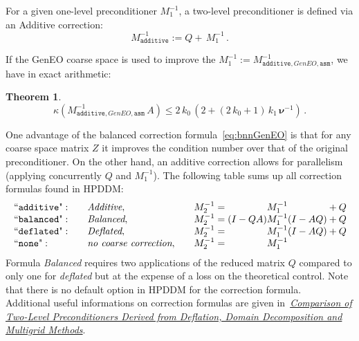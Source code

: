 \documentclass{article}
\newtheorem{theorem}{Theorem}[section]
\begin{document}
For a given one-level preconditioner $M_1^{-1}$, a two-level preconditioner is defined via an Additive correction:
\begin{equation}
  \label{eq:add}
  \boxed{
 M_{\texttt{additive}}^{-1} := Q+\,M_{1}^{-1}\,.
 }
\end{equation}


If the GenEO coarse space is used to improve the $M_1^{-1}:=M_{\texttt{additive},GenEO,\texttt{asm}}^{-1}$, we have in exact arithmetic:
\begin{theorem}
  \label{th:geneoadditive}
\[
 \kappa({M_{\texttt{additive},GenEO,\texttt{asm}}^{-1}\,A}) \le 2\,k_0\,(2+(2\,k_0+1)\,k_1\,\boldsymbol{\nu}^{-1})\,.
\]
\end{theorem}
One advantage of the balanced correction formula~\eqref{eq:bnnGenEO} is that for any coarse space matrix $Z$ it improves the condition number over that of the original preconditioner. On the other hand, an additive correction allows for parallelism (applying concurrently $Q$ and $M_{1}^{-1}$). The following table sums up all correction formulas found in HPDDM: 
\begin{equation}
\begin{array}{llll}
\nonumber
    \text{``\texttt{additive}"}:&&\textit{Additive}, \quad &M^{-1}_2 = \phantom{(I - Q A) }M^{-1}_1\phantom{ (I - A Q)} + Q\\
    \text{``\texttt{balanced}"}:&&\textit{Balanced}, \quad &M^{-1}_2 = (I - Q A) M^{-1}_1 (I - A Q) + Q\\
    \text{``\texttt{deflated}"}:&&\textit{Deflated}, \quad &M^{-1}_2 = \phantom{(I - Q A)} M^{-1}_1 (I - A Q) + Q\\
    \text{``\texttt{none}"}:&&\textit{no coarse correction}, \quad &M^{-1}_2 = \phantom{(I - Q A) }M^{-1}_1\phantom{ (I - A Q)}\\
\end{array}
\end{equation}
Formula \textit{Balanced} requires two applications of the reduced matrix $Q$ compared to only one for  \textit{deflated} but at the expense of a loss on the theoretical control. Note that there is no default option in HPDDM for the correction formula.\\
Additional useful informations on correction formulas are given in~\href{https://link.springer.com/article/10.1007/s10915-009-9272-6}{{\em Comparison of Two-Level Preconditioners Derived from Deflation, Domain Decomposition and Multigrid Methods}}. 
\end{document}
